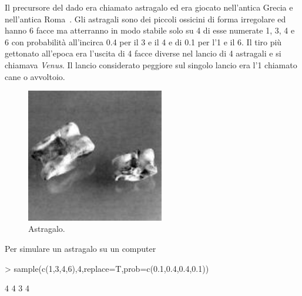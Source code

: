 \documentclass[onecolumn,12pt]{book}
\begin{document}
Il precursore  del dado era chiamato astragalo ed era giocato nell'antica Grecia e nell'antica Roma~\cite{david}.
Gli  astragali sono dei piccoli ossicini di forma irregolare ed hanno 6 facce ma atterranno in  modo stabile solo su 4 di esse numerate 1, 3, 4 e 6  con probabilit\`a all'incirca 0.4 per il 3 e il 4  e di 0.1 per l'1 e il 6.
Il tiro pi\`u gettonato all'epoca era l'uscita di 4 facce diverse nel lancio di 4 astragali e si chiamava {\it Venus}.
Il lancio considerato peggiore sul singolo lancio era l'1 chiamato cane o avvoltoio.
\begin{figure}[htbp]
\begin{center}
\includegraphics[width=6cm]{../grafici/astragals.jpeg}
\caption{ Astragalo. }
\label{fig:daiist}
\end{center}
\end{figure}
Per simulare un astragalo su un computer
\begin{Schunk}
\begin{Sinput}
> sample(c(1,3,4,6),4,replace=T,prob=c(0.1,0.4,0.4,0.1))
\end{Sinput}
\begin{Soutput}
[1] 4 4 3 4
\end{Soutput}
\end{Schunk}
\end{document}
